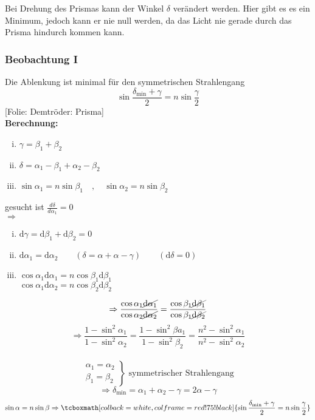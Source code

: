 \documentclass[titlepage,11pt,a4paper,ngerman]{report}
\newcommand{\tx}[1]{\textrm{#1}}
\newcommand{\folie}[1]{\color{gray}[Folie: #1]\color{black}}
\newcommand{\lcom}[1]{\color{MidnightBlue}#1\color{black}}
\newcommand{\rmbox}[1]{\tcboxmath[colback=white,colframe=red!75!black]{#1}}
\begin{document}
\lcom{Bei Drehung des Prismas kann der Winkel $ \delta $ verändert werden. Hier gibt es es ein Minimum, jedoch kann er nie null werden, da das Licht nie gerade durch das Prisma hindurch kommen kann.}

\subsubsection{Beobachtung I}
Die Ablenkung ist minimal für den symmetrischen  Strahlengang
\begin{equation*}
\sin \frac{\delta_{\tx{min}} + \gamma}{2} = n \sin \frac{\gamma}{2}
\end{equation*}
\folie{Demtröder: Prisma}\\
\textbf{Berechnung:}
\begin{enumerate}[(i)]
	\item $ \gamma = \beta_1 + \beta_2 $
	\item $ \delta = \alpha_1 - \beta_1 + \alpha_2 - \beta_2 $
	\item $ \sin \alpha_1 = n \sin \beta_1 \quad , \quad \sin \alpha_2 = n \sin \beta_2 $
\end{enumerate}
gesucht ist $ \frac{d\delta}{d \alpha_1} = 0 $\\
$ \Rightarrow $
\begin{enumerate}[(i)]
	\item $ \tx{d}\gamma = \tx{d}\beta_1 + \tx{d}\beta_2 = 0 $
	\item $ \tx{d}\alpha_1 = \tx{d}\alpha_2 \qquad (\delta = \alpha + \alpha - \gamma) \qquad (\mathrm{d} \delta = 0) $
	\item $ \cos \alpha_1 \tx{d} \alpha_1 = n \cos \beta_1 \tx{d} \beta_1 $\\
	$ \cos \alpha_1 \tx{d} \alpha_2 = n \cos \beta_2 \tx{d} \beta_2 $
\end{enumerate}

$$\Rightarrow\frac{\cos\alpha_1\cancel{\tx{d}\alpha_1}}{\cos\alpha_2\cancel{\tx{d}\alpha_2}}=\frac{\cos\beta_1\cancel{\tx{d}\beta_1}}{\cos\beta_1\cancel{\tx{d}\beta_2}}$$
$$\Rightarrow\frac{1-\sin^2\alpha_1}{1-\sin^2\alpha_2}=\frac{1-\sin^2\beta  a_1}{1-\sin^2\beta_2}=\frac{n^2-\sin^2\alpha_1}{n^2-\sin^2\alpha_2}$$\\[-10pt]
$$\left.\begin{array}{c}
\alpha_1=\alpha_2 \\
\beta_1=\beta_2\end{array} \right\} \textrm{ symmetrischer Strahlengang}$$
$$\Rightarrow\delta_\tx{min}=\alpha_1+\alpha_2-\gamma=2\alpha-\gamma$$
$$\sin\alpha=n\sin\beta\Rightarrow\rmbox{\sin\frac{\delta_\tx{min}+\gamma}{2}  =n\sin\frac{\gamma}{2}}$$
\end{document}
